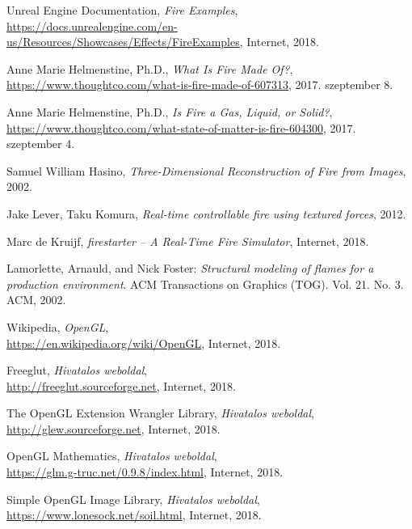 \begin{thebibliography}{x}
 Unreal Engine Documentation, 
 \textit{Fire Examples},\\
 \url{https://docs.unrealengine.com/en-us/Resources/Showcases/Effects/FireExamples}, Internet, 2018.
 
 Anne Marie Helmenstine, Ph.D., 
 \textit{What Is Fire Made Of?},\\
 \url{https://www.thoughtco.com/what-is-fire-made-of-607313}, 2017. szeptember 8.

 Anne Marie Helmenstine, Ph.D., 
 \textit{Is Fire a Gas, Liquid, or Solid?},\\
 \url{https://www.thoughtco.com/what-state-of-matter-is-fire-604300}, 2017. szeptember 4.

  Samuel William Hasino,
  \textit{Three-Dimensional Reconstruction of Fire from Images},
 2002.

  Jake Lever, Taku Komura,
  \textit{Real-time controllable fire using textured forces},
2012.

  Marc de Kruijf,
  \textit{firestarter – A Real-Time Fire Simulator}, Internet, 2018.

Lamorlette, Arnauld, and Nick Foster: \emph{Structural modeling of flames for a production environment}. ACM Transactions on Graphics (TOG). Vol. 21. No. 3. ACM, 2002.
 
 Wikipedia, 
 \textit{OpenGL},\\
 \url{https://en.wikipedia.org/wiki/OpenGL}, Internet, 2018.
 
 Freeglut, 
 \textit{Hivatalos weboldal},\\
 \url{http://freeglut.sourceforge.net}, Internet, 2018.
 
 The OpenGL Extension Wrangler Library, 
 \textit{Hivatalos weboldal},\\
 \url{http://glew.sourceforge.net}, Internet, 2018.
 
 OpenGL Mathematics, 
 \textit{Hivatalos weboldal},\\
 \url{https://glm.g-truc.net/0.9.8/index.html}, Internet, 2018.

Simple OpenGL Image Library, 
 \textit{Hivatalos weboldal},\\
 \url{https://www.lonesock.net/soil.html}, Internet, 2018.

\end{thebibliography}

